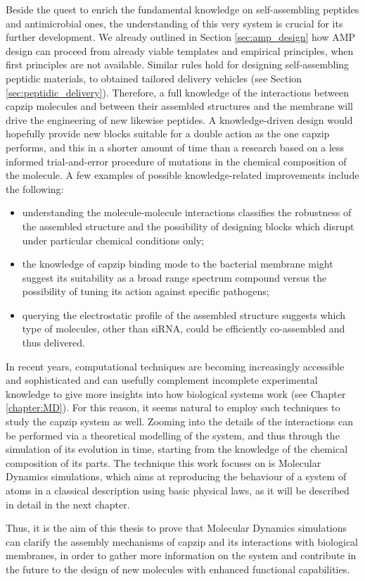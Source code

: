 Beside the quest to enrich the fundamental knowledge on self-assembling peptides and antimicrobial ones, the understanding of this very system is crucial for its further development. We already outlined in Section \ref{sec:amp_design} how AMP design can proceed from already viable templates and empirical principles, when first principles are not available. Similar rules hold for designing self-assembling peptidic materials, to obtained tailored delivery vehicles (see Section \ref{sec:peptidic_delivery}).
%
Therefore, a full knowledge of the interactions between capzip molecules and between their assembled structures and the membrane will drive the engineering of new likewise peptides. A knowledge-driven design would hopefully provide new blocks suitable for a double action as the one capzip performs, and this in a shorter amount of time than a research based on a less informed trial-and-error procedure of mutations in the chemical composition of the molecule. A few examples of possible knowledge-related improvements include the following:
\begin{itemize}
\item understanding the molecule-molecule interactions classifies the robustness of the assembled structure and the possibility of designing blocks which disrupt under particular chemical conditions only;
\item the knowledge of capzip binding mode to the bacterial membrane might suggest its suitability as a broad range spectrum compound versus the possibility of tuning its action against specific pathogens;
\item querying the electrostatic profile of the assembled structure suggests which type of molecules, other than siRNA, could be efficiently co-assembled and thus delivered.
\end{itemize}

In recent years, computational techniques are becoming increasingly accessible and sophisticated and can usefully complement incomplete experimental knowledge to give more insights into how biological systems work (see Chapter \ref{chapter:MD}). For this reason, it seems natural to employ such techniques to study the capzip system as well. Zooming into the details of the interactions can be performed via a theoretical modelling of the system, and thus through the simulation of its evolution in time, starting from the knowledge of the chemical composition of its parts. The technique this work focuses on is Molecular Dynamics simulations, which aims at reproducing the behaviour of a system of atoms in a classical description using basic physical laws, as it will be described in detail in the next chapter.

Thus, it is the aim of this thesis to prove that Molecular Dynamics simulations can clarify the assembly mechanisms of capzip and its interactions with biological membranes, in order to gather more information on the system and contribute in the future to the design of new molecules with enhanced functional capabilities.
